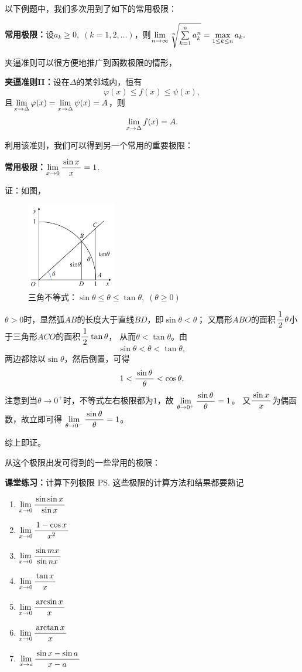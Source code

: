 以下例题中，我们多次用到了如下的常用极限：
\begin{thx}
  {\bf 常用极限：}设$a_k\geq0,\;(k=1,2,\ldots)$，则$\lim\limits_{n\to\infty}\sqrt[n]
  {\sum\limits_{k=1}^na_k^n}=\max\limits_{1\leq k\leq n}a_k.$
\end{thx}

\bs
夹逼准则可以很方便地推广到函数极限的情形，
\begin{thx}
	{\bf 夹逼准则II：}设在$\Delta$的某邻域内，恒有
	$$\varphi(x)\leq f(x)\leq\psi(x), $$
	且$\lim\limits_{x\to{\Delta}}\varphi(x)=\lim\limits_{x\to{\Delta}}\psi(x)=A$，则
	$$\lim\limits_{x\to{\Delta}}f(x)=A.$$
\end{thx}

利用该准则，我们可以得到另一个常用的重要极限：
\begin{thx}
	{\bf 常用极限：}$\lim\limits_{x\to{0}}\displaystyle\frac{\,{\sin x}\,}{\,{x}\,}=1$.
\end{thx}

证：如图，
	
\begin{figure}[h]
	\centering
	\includegraphics[width=0.35\textwidth]{./Images/Ch01/xsintan.pdf}
	\caption{三角不等式：$\sin\theta\leq\theta\leq\tan\theta,
	\;(\theta\geq0)$}
	\label{fig:xsintan}
\end{figure}
$\theta>0$时，显然弧$AB$的长度大于直线$BD$，即$\sin\theta<\theta$；
又扇形$ABO$的面积$\displaystyle\frac{\,{1}\,}{\,{2}\,}\theta$小于三角形$ACO$的面积$\displaystyle\frac{\,{1}\,}{\,{2}\,}\tan\theta$，
从而$\theta<\tan\theta$。由
$$\sin\theta<\theta<\tan\theta,$$
两边都除以$\sin\theta$，然后倒置，可得
$$1<\displaystyle\frac{\,{\sin\theta}\,}{\,{\theta}\,}<\cos\theta,$$
注意到当$\theta\to 0^+$时，不等式左右极限都为$1$，故
$\lim\limits_{\theta\to0^+}\displaystyle\frac{\,{\sin\theta}\,}{\,{\theta}\,}=1$。
又$\displaystyle\frac{\,{\sin x}\,}{\,{x}\,}$为偶函数，故立即可得
$\lim\limits_{\theta\to0^-}\displaystyle\frac{\,{\sin\theta}\,}{\,{\theta}\,}=1$。

综上即证。\fin

\bs

从这个极限出发可得到的一些常用的极限：

{\bf 课堂练习：}计算下列极限
\ps{\baa 这些极限的计算方法和结果都要熟记}
\begin{enumerate}[(1)]
	  \setlength{\itemindent}{1cm}
  \item $\lim\limits_{x\to{0}}\displaystyle\frac{\,{\sin\sin x}\,}{\,{\sin x}\,}$ 
  \item $\lim\limits_{x\to{0}}\displaystyle\frac{\,{1-\cos x}\,}{\,{x^2}\,}$ 
  \item $\lim\limits_{x\to{0}}\displaystyle\frac{\,{\sin mx}\,}{\,{\sin nx}\,}$
  \item $\lim\limits_{x\to{0}}\displaystyle\frac{\,{\tan x}\,}{\,{x}\,}$
  \item $\lim\limits_{x\to{0}}\displaystyle\frac{\,{\arcsin x}\,}{\,{x}\,}$
  \item $\lim\limits_{x\to{0}}\displaystyle\frac{\,{\arctan x}\,}{\,{x}\,}$
  \item $\lim\limits_{x\to{a}}\displaystyle\frac{\,{\sin x-\sin a}\,}{\,{x-a}\,}$
\end{enumerate}

